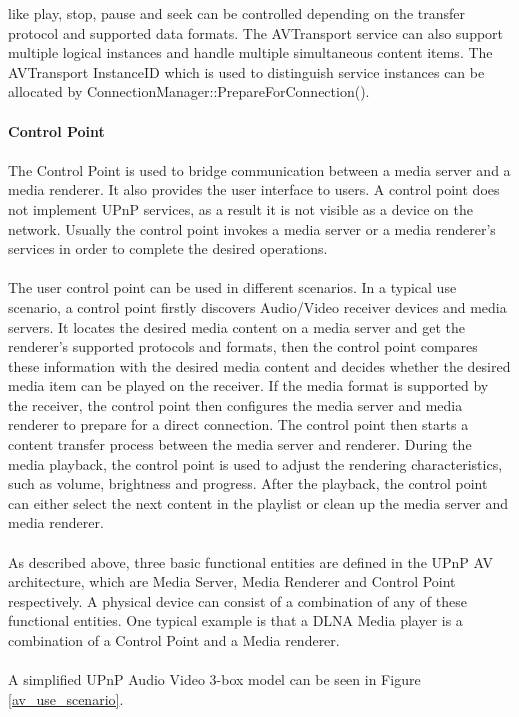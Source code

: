 like play, stop, pause and seek can be controlled depending on the transfer 
protocol and supported data formats. The AVTransport service can also support 
multiple logical instances and handle multiple simultaneous content items. The 
AVTransport InstanceID which is used to distinguish service instances can be 
allocated by ConnectionManager::PrepareForConnection(). \\
\\
\textbf{Control Point} \\ 
\\
The Control Point is used to bridge communication between a media server and a media renderer. 
It also provides the user interface to users. A control point does not implement UPnP 
services, as a result it is not visible as a device on the network. Usually the control point 
invokes a media server or a media renderer's services in order to complete the 
desired operations.\\
\\
The user control point can be used in different scenarios. In a typical use
scenario, a control point firstly discovers Audio/Video receiver devices and
media servers. It locates the desired media content on a media server and get
the renderer's supported protocols and formats, then the control point compares
these information with the desired media content and decides whether the desired
media item can be played on the receiver. If the media format is supported by
the receiver, the control point then configures the media server and media
renderer to prepare for a direct connection. The control point then starts a
content transfer process between the media server and renderer. During the
media playback, the control point is used to adjust the rendering
characteristics, such as volume, brightness and progress. After the playback,
the control point can either select the next content in the playlist or clean up
the media server and media renderer.\\
\\ 
As described above, three basic functional entities are defined in the UPnP AV 
architecture\cite{upnp-av}, which are Media Server, Media Renderer and Control Point respectively.
A physical device can consist of a combination of any of these functional 
entities. One typical example is that a DLNA Media player is a combination of a Control 
Point and a Media renderer. \\
\\
A simplified UPnP Audio Video 3-box model \cite{DLNA_proxy} can be 
seen in Figure \ref{av_use_scenario}.

